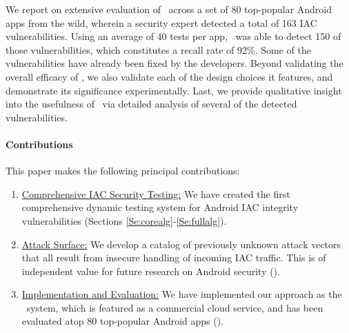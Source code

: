We report on extensive evaluation of \Tool\ across a set of 80 top-popular Android apps from the wild, wherein a security expert detected a total of 163 IAC vulnerabilities. 
Using an average of 40 tests per app, \Tool\ was able to detect 150 of those vulnerabilities, which constitutes a recall rate of 92\%. Some of the vulnerabilities have already been fixed by the developers. Beyond validating the overall efficacy of \Tool, we also validate each of the design choices it features, and demonstrate its significance experimentally. Last, we provide qualitative insight into the usefulness of \Tool\ via detailed analysis of several of the detected vulnerabilities.

\paragraph{Contributions} This paper makes the following principal contributions:
\begin{enumerate}
	\item \underline{Comprehensive IAC Security Testing:} We have created the first comprehensive dynamic testing system for Android IAC integrity vulnerabilities (Sections \ref{Se:corealg}-\ref{Se:fullalg}).
	\item \underline{Attack Surface:} We develop a catalog of previously unknown attack vectors that all result from insecure handling of incoming IAC traffic. This is of independent value for future research on Android security (). 
	\item \underline{Implementation and Evaluation:} We have implemented our approach as the \Tool\ system, which is featured as a commercial cloud service, and has been evaluated atop 80 top-popular Android apps ().
\end{enumerate}


 